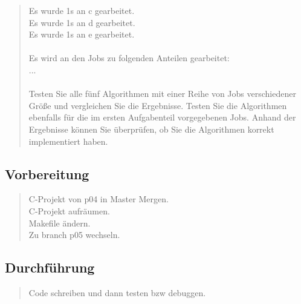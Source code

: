 \begin{quote}
			Es wurde 1s an c gearbeitet.\\
			Es wurde 1s an d gearbeitet.\\
			Es wurde 1s an e gearbeitet.\\ \\
			Es wird an den Jobs zu folgenden Anteilen gearbeitet:\\
			...\\ \\
			Testen Sie alle f\"unf Algorithmen mit einer Reihe von Jobs verschiedener Gr\"oße und vergleichen Sie die Ergebnisse. Testen Sie die Algorithmen ebenfalls f\"ur die im ersten Aufgabenteil vorgegebenen Jobs. Anhand der Ergebnisse k\"onnen Sie \"uberpr\"ufen, ob Sie die Algorithmen korrekt implementiert haben.\\
		\end{quote}
	\subsection{Vorbereitung}
		\begin{quote}
			C-Projekt von p04 in Master Mergen.\\
			C-Projekt aufr\"aumen.\\
			Makefile \"andern.\\
			Zu branch p05 wechseln.\\
		\end{quote}
	\subsection{Durchführung}
		\begin{quote}
			Code schreiben und dann testen bzw debuggen.
		\end{quote}
